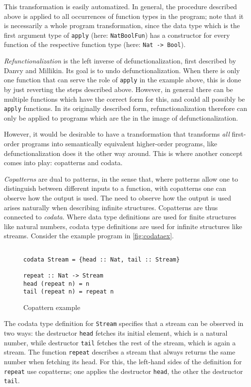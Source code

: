 This transformation is easily automatized. In general, the procedure described above is applied to all occurrences of function types in the program; note that it is necessarily a whole program transformation, since the data type which is the first argument type of \texttt{apply} (here: \texttt{NatBoolFun}) has a constructor for every function of the respective function type (here: \texttt{Nat -> Bool}).

\textit{Refunctionalization} is the left inverse of defunctionalization, first described by Danvy and Millikin\cite{danvy09refunctionalization}. Its goal is to undo defunctionalization. When there is only one function that can serve the role of \texttt{apply} in the example above, this is done by just reverting the steps described above. However, in general there can be multiple functions which have the correct form for this, and could all possibly be \texttt{apply} functions. In its originally described form, refunctionalization therefore can only be applied to programs which are the in the image of defunctionalization.

However, it would be desirable to have a transformation that transforms \textit{all} first-order programs into semantically equivalent higher-order programs, like defunctionalization does it the other way around. This is where another concept comes into play: copatterns and codata.

\textit{Copatterns} are dual to patterns, in the sense that, where patterns allow one to distinguish between different inputs to a function, with copatterns one can observe how the output is used. The need to observe how the output is used arises naturally when describing infinite structures. Copatterns are thus connected to \textit{codata}. Where data type definitions are used for finite structures like natural numbers, codata type definitions are used for infinite structures like streams. Consider the example program in \autoref{fig:codataex}.

\begin{figure}
\begin{lstlisting}

codata Stream = {head :: Nat, tail :: Stream}

repeat :: Nat -> Stream
head (repeat n) = n
tail (repeat n) = repeat n

\end{lstlisting}
\caption{Copattern example}
\label{fig:codataex}
\end{figure}

The codata type definition for \texttt{Stream} specifies that a stream can be observed in two ways: the destructor \texttt{head} fetches its initial element, which is a natural number, while destructor \texttt{tail} fetches the rest of the stream, which is again a stream. The function \texttt{repeat} describes a stream that always returns the same number when fetching its head. For this, the left-hand sides of the definition for \texttt{repeat} use copatterns; one applies the destructor \texttt{head}, the other the destructor \texttt{tail}.

